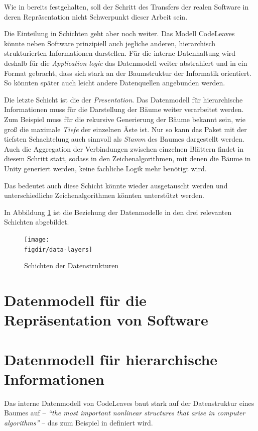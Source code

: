 Wie in  bereits festgehalten, soll der Schritt des Transfers der realen Software in deren Repräsentation nicht Schwerpunkt dieser Arbeit sein.

Die Einteilung in Schichten geht aber noch weiter. Das Modell CodeLeaves könnte neben Software prinzipiell auch jegliche anderen, hierarchisch strukturierten Informationen darstellen. Für die interne Datenhaltung wird deshalb für die \textit{Application logic} das Datenmodell weiter abstrahiert und in ein Format gebracht, dass sich stark an der Baumstruktur der Informatik orientiert. So könnten später auch leicht andere Datenquellen angebunden werden.

Die letzte Schicht ist die der \textit{Presentation}. Das Datenmodell für hierarchische Informationen muss für die Darstellung der Bäume weiter verarbeitet werden. Zum Beispiel muss für die rekursive Generierung der Bäume bekannt sein, wie groß die maximale \textit{Tiefe} der einzelnen Äste ist. Nur so kann das Paket mit der tiefsten Schachtelung auch sinnvoll als \textit{Stamm} des Baumes dargestellt werden. Auch die Aggregation der Verbindungen zwischen einzelnen Blättern findet in diesem Schritt statt, sodass in den Zeichenalgorithmen, mit denen die Bäume in Unity generiert werden, keine fachliche Logik mehr benötigt wird.

Das bedeutet auch diese Schicht könnte wieder ausgetauscht werden und unterschiedliche Zeichenalgorithmen könnten unterstützt werden.

In Abbildung \ref{fig:data-layers} ist die Beziehung der Datenmodelle in den drei relevanten Schichten abgebildet.

\begin{figure}[htb]
  \texttt{[image: \\figdir/data-layers]}
  \caption{Schichten der Datenstrukturen}
  \label{fig:data-layers}
\end{figure}

\section{Datenmodell für die Repräsentation von Software}
\label{sec:software-model}

\section{Datenmodell für hierarchische Informationen}
\label{sec:hierarchical-model}

Das interne Datenmodell von CodeLeaves baut stark auf der Datenstruktur eines Baumes auf -- \textit{"`the most important nonlinear structures that arise in computer algorithms"'}\cite{knuth1973fundamental} -- das zum Beispiel in \cite{knuth1973fundamental, ernst2016grundkurs, gumm2009einfuehrung} definiert wird.

